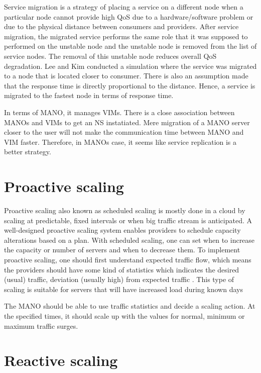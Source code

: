 Service migration is a strategy of placing a service on a different node when a particular node cannot provide high QoS due to a hardware/software problem or due to the physical distance between consumers and providers. After service migration, the migrated service performs the same role that it was supposed to performed on the unstable node and the unstable node is removed from the list of service nodes.
The removal of this unstable node reduces overall QoS degradation.
Lee and Kim \cite{lee_software_2010} conducted a simulation where the service was migrated to a node that is located closer to consumer. There is also an assumption made that the response time is directly proportional to the distance. Hence, a service is migrated to the fastest node in terms of response time.

In terms of MANO, it manages VIMs. There is a close association between MANOs and VIMs to get an NS instatiated.
Mere migration of a MANO server closer to the user will not make the communication time between MANO and VIM faster. Therefore, in MANOs case, it seems like service replication is a better strategy.


\section{Proactive scaling}

Proactive scaling also known as scheduled scaling is mostly done in a cloud by scaling at predictable, fixed intervals or when big traffic stream is anticipated. A well-designed proactive scaling system enables providers to schedule capacity alterations based on a plan.
With scheduled scaling, one can set when to increase the capacity or number of servers and when to decrease them. To implement proactive scaling, one should first understand expected traffic flow, which means the providers should have some kind of statistics which indicates the desired (usual) traffic, deviation (usually high) from expected traffic \cite{falatah_cloud_2014} \cite{reese_cloud_nodate}. This type of scaling is suitable for servers that will have increased load during known days 

The MANO should be able to use traffic statistics and decide a scaling action. At the specified times, it should scale up with the values for normal, minimum or maximum traffic surges.


\section{Reactive scaling}


